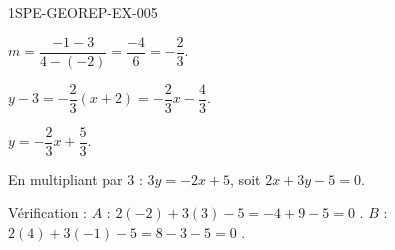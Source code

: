 \begin{corrige}{1SPE-GEOREP-EX-005}


$m = \dfrac{-1 - 3}{4 - (-2)} = \dfrac{-4}{6} = -\dfrac{2}{3}$.

$y - 3 = -\dfrac{2}{3}(x + 2) = -\dfrac{2}{3}x - \dfrac{4}{3}$.

$y = -\dfrac{2}{3}x + \dfrac{5}{3}$.

En multipliant par $3$ : $3y = -2x + 5$, soit $\boxed{2x + 3y - 5 = 0}$.

Vérification : $A$ : $2(-2) + 3(3) - 5 = -4 + 9 - 5 = 0$ \checkmark. $B$ : $2(4) + 3(-1) - 5 = 8 - 3 - 5 = 0$ \checkmark.

\end{corrige}
